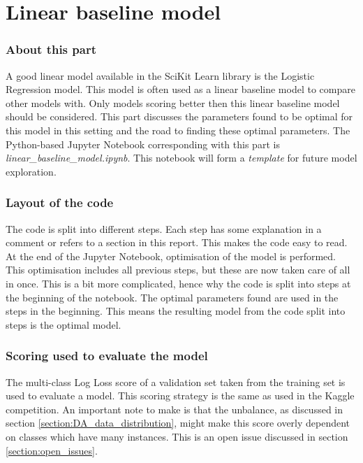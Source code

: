 \part{Linear baseline model}
\label{part:linear_baseline}


\section{About this part}
\label{section:LBM_about_part}
A good linear model available in the SciKit Learn library is the Logistic Regression model.
This model is often used as a linear baseline model to compare other models with.
Only models scoring better then this linear baseline model should be considered.
This part discusses the parameters found to be optimal for this model in this setting and the road to finding these optimal parameters.
The Python-based Jupyter Notebook corresponding with this part is \emph{linear\_baseline\_model.ipynb}.
This notebook will form a \emph{template} for future model exploration.


\section{Layout of the code}
\label{section:LBM_layout_of_code}

The code is split into different steps.
Each step has some explanation in a comment or refers to a section in this report. 
This makes the code easy to read.
At the end of the Jupyter Notebook, optimisation of the model is performed.
This optimisation includes all previous steps, but these are now taken care of all in once.
This is a bit more complicated, hence why the code is split into steps at the beginning of the notebook.
The optimal parameters found are used in the steps in the beginning.
This means the resulting model from the code split into steps is the optimal model.


\section{Scoring used to evaluate the model}
\label{section:LBM_scoring_used}

The multi-class Log Loss score of a validation set taken from the training set is used to evaluate a model.
This scoring strategy is the same as used in the Kaggle competition.
An important note to make is that the unbalance, as discussed in section \ref{section:DA_data_distribution}, might make this score overly dependent on classes which have many instances.
This is an open issue discussed in section \ref{section:open_issues}.


